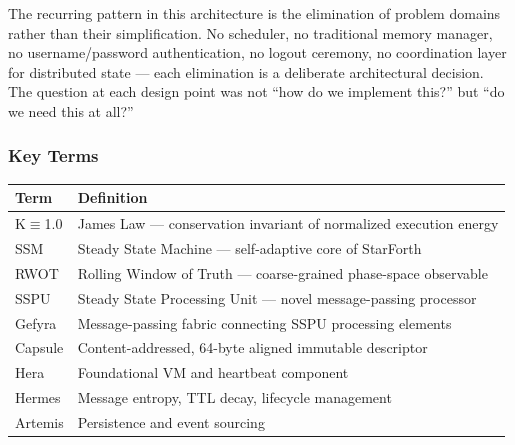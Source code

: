 The recurring pattern in this architecture is the elimination of problem
domains rather than their simplification. No scheduler, no traditional memory
manager, no username/password authentication, no logout ceremony, no
coordination layer for distributed state — each elimination is a deliberate
architectural decision. The question at each design point was not ``how do we
implement this?'' but ``do we need this at all?''

\subsubsection{Key Terms}

\begin{center}
\begin{tabular}{lp{8cm}}
\toprule
Term & Definition \\
\midrule
K$\equiv$1.0 & James Law — conservation invariant of normalized execution energy \\
SSM   & Steady State Machine — self-adaptive core of StarForth \\
RWOT  & Rolling Window of Truth — coarse-grained phase-space observable \\
SSPU  & Steady State Processing Unit — novel message-passing processor \\
Gefyra & Message-passing fabric connecting SSPU processing elements \\
Capsule & Content-addressed, 64-byte aligned immutable descriptor \\
Hera  & Foundational VM and heartbeat component \\
Hermes & Message entropy, TTL decay, lifecycle management \\
Artemis & Persistence and event sourcing \\
\bottomrule
\end{tabular}
\end{center}
